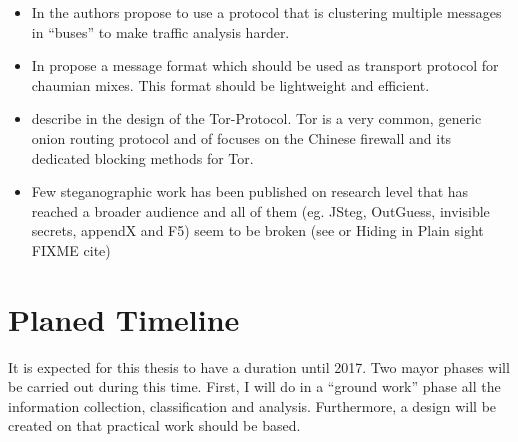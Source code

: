 \documentclass[twocolumn,a4paper,10pt,english]{scrartcl}
\begin{document}
\begin{itemize}
\item In \cite{buses03} the authors \citeauthor{buses03} propose to use a protocol that is clustering multiple messages in ``buses'' to make traffic analysis harder.
\item In \cite{danezis:wpes2004} \citeauthor{danezis:wpes2004} propose a message format which should be used as transport protocol for chaumian mixes. This format should be lightweight and efficient.
\item \citeauthor{tor-design} describe in \cite{tor-design} the design of the Tor-Protocol. Tor is a very common, generic onion routing protocol and \cite{foci12-winter} of \citeauthor{foci12-winter} focuses on the Chinese firewall and its dedicated blocking methods for Tor.
\item Few steganographic work has been published on research level that has reached a broader audience and all of them (eg. JSteg, OutGuess, invisible secrets, appendX and F5\cite{f5}) seem to be broken (see \cite{hideAndSeek} or Hiding in Plain sight FIXME cite)
\end{itemize}

\section{Planed Timeline}
It is expected for this thesis to have a duration until 2017. Two mayor phases will be carried out during this time. First, I will do in a ``ground work'' phase all the information collection, classification and analysis. Furthermore, a design will be created on that practical work should be based.\par
\end{document}
